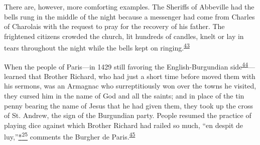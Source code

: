 There are, however, more comforting examples. The Sheriffs of Abbeville
had the bells rung in the middle of the night because a messenger had
come from Charles of Charolais with the request to pray for the recovery
of his father. The frightened citizens crowded the church, lit hundreds
of candles, knelt or lay in tears throughout the night while the bells
kept on
ringing.\textsuperscript{\protect\hypertarget{08_Chapter_One__THE_PASSIONATE_INTE.xhtmlux5cux23id_2145}{\protect\hyperlink{23_NOTES.xhtmlux5cux23id_2146}{43}}}

When the people of Paris---in 1429 still favoring the English-Burgundian
side\textsuperscript{\protect\hypertarget{08_Chapter_One__THE_PASSIONATE_INTE.xhtmlux5cux23id_2143}{\protect\hyperlink{23_NOTES.xhtmlux5cux23id_2144}{44}}}---learned
that Brother Richard, who had just a short time before moved them with
his sermons, was an Armagnac who surreptitiously won over the towns he
visited, they cursed him in the name of God and all the saints; and in
place of the tin penny bearing the name of Jesus that he had given them,
they took up the cross of St. Andrew, the sign of the Burgundian party.
People resumed the practice of playing dice against which Brother
\protect\hypertarget{08_Chapter_One__THE_PASSIONATE_INTE.xhtmlux5cux23page_19}{}{}Richard
had railed so much, ``en despit de
luy,''\protect\hypertarget{08_Chapter_One__THE_PASSIONATE_INTE.xhtmlux5cux23id_2294}{\protect\hyperlink{23_NOTES.xhtmlux5cux23id_2293}{*\textsuperscript{25}}}
comments the Burgher de
Paris.\textsuperscript{\protect\hypertarget{08_Chapter_One__THE_PASSIONATE_INTE.xhtmlux5cux23id_2141}{\protect\hyperlink{23_NOTES.xhtmlux5cux23id_2142}{45}}}

